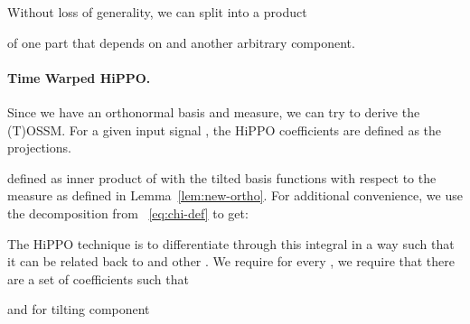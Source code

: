 \documentclass{article}
\begin{document}
Without loss of generality, we can split  into a product


of one part that depends on  and another arbitrary component.

\paragraph{Time Warped HiPPO.}

Since we have an orthonormal basis and measure, we can try to derive the  (T)OSSM. For a given input signal , the HiPPO coefficients are defined as the projections.




defined as inner product of  with the tilted basis functions  with respect to the measure  as defined in  Lemma~\ref{lem:new-ortho}. For additional convenience, we  use the decomposition  from ~\eqref{eq:chi-def} to get:






The HiPPO technique is to differentiate through this integral in a way such that it can be related back to  and other .  We require for every , we require that there are a set of coefficients  such that



and for tilting component 
\end{document}
